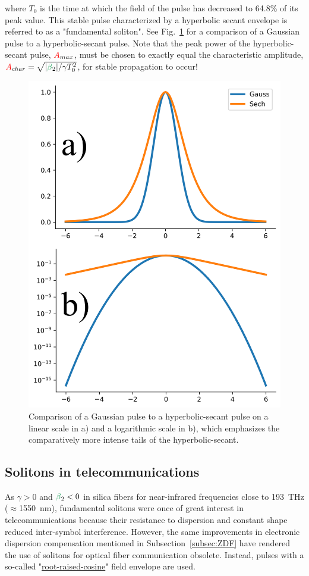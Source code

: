where $T_0$ is the time at which the field of the pulse has decreased to 64.8\% of its peak value. This stable pulse characterized by a hyperbolic secant envelope is referred to as a "fundamental soliton". See Fig.~\ref{fig:gauss_sech} for a comparison of a Gaussian pulse to a hyperbolic-secant pulse. Note that the peak power of the hyperbolic-secant pulse, $\textcolor{red}{A}_{max}$, must be chosen to exactly equal the characteristic amplitude, $\A_{char}=\sqrt{|\betag_2|/\gamma T_0^2}$, for stable propagation to occur!
\begin{figure}
    \centering
    \includegraphics[width=1\linewidth]{figures/gauss_sech_comparison.png}
    \caption{Comparison of a Gaussian pulse to a hyperbolic-secant pulse on a linear scale in a) and a logarithmic scale in b), which emphasizes the comparatively more intense tails of the hyperbolic-secant.  }
    \label{fig:gauss_sech}
\end{figure}
\subsection{Solitons in telecommunications}
As $\gamma>0$ and $\betag_2<0$ in silica fibers for near-infrared frequencies close to 193~THz ($\approx$1550~nm), fundamental solitons were once of great interest in telecommunications because their resistance to dispersion and constant shape reduced inter-symbol interference. However, the same improvements in electronic dispersion compensation mentioned in Subsection~\ref{subsec:ZDF} have rendered the use of solitons for optical fiber communication obsolete. Instead, pulses with a so-called "\href{https://www.youtube.com/watch?v=Qe8NQx4ibE8}{root-raised-cosine}" field envelope are used.   


